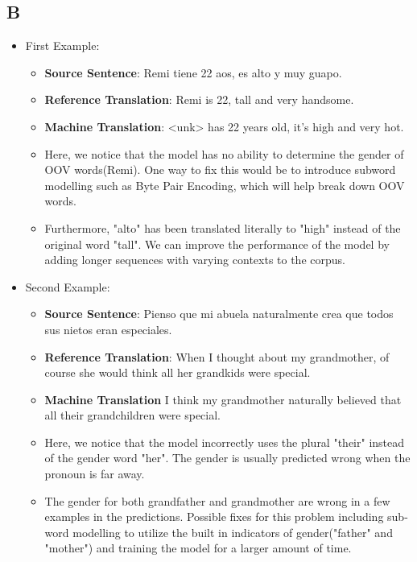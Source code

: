 \documentclass[a4paper]{article}
\begin{document}
\subsection{B}
\begin{itemize}
    \item First Example:
    \begin{itemize}
        \item \textbf{Source Sentence}: Remi tiene 22 aos, es alto y muy guapo.
        \item \textbf{Reference Translation}:  Remi is 22,  tall and very handsome.
        \item \textbf{Machine Translation}: <unk> has 22 years old, it's high and very hot.
        \item Here, we notice that the model has no ability to determine the gender of OOV words(Remi). One way to fix this would be to introduce subword modelling such as Byte Pair Encoding, which will help break down OOV words.
        \item Furthermore, "alto" has been translated literally to "high" instead of the original word "tall". We can improve the performance of the model by adding longer sequences with varying contexts to the corpus.
    \end{itemize}
    \item Second Example:
    \begin{itemize}
        \item \textbf{Source Sentence}: Pienso que mi abuela naturalmente crea que todos sus nietos eran especiales.
        \item \textbf{Reference Translation}:  When I thought about my grandmother,  of course she would think all her grandkids were special.
        \item \textbf{Machine Translation}  I think my grandmother naturally believed that all their grandchildren were special.
        \item Here, we notice that the model incorrectly uses the plural "their" instead of the gender word "her". The gender is usually predicted wrong when the pronoun is far away.
        \item The gender for both grandfather and grandmother are wrong in a few examples in the predictions. Possible fixes for this problem including sub-word modelling to utilize the built in indicators of gender("father" and "mother") and training the model for a larger amount of time.
    \end{itemize}
\end{itemize}
\end{document}
